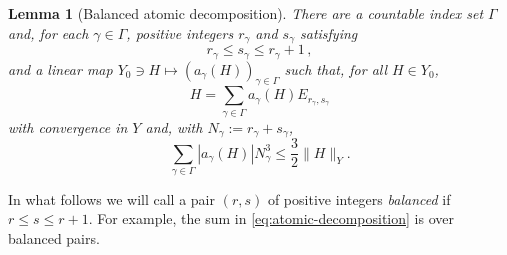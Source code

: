 \documentclass[11pt]{amsart}
\newtheorem{lemma}[theorem]{Lemma}
\theoremstyle{definition}
\theoremstyle{remark}
\begin{document}
\begin{lemma}[Balanced atomic decomposition]\label{lem:balanced-decomp}
There are a countable index set $\Gamma$ and, for each $\gamma\in\Gamma$, positive integers $r_\gamma$ and $s_\gamma$ satisfying
\[
 r_\gamma\leq s_\gamma\leq r_\gamma+1 \,,
\]
and a linear map $Y_0\ni H\mapsto (a_\gamma(H))_{\gamma\in\Gamma}$ such that, for all $H\in Y_0$,
\begin{equation}\label{eq:atomic-decomposition}
 H=\sum_{\gamma\in\Gamma} a_\gamma(H)E_{r_\gamma,s_\gamma}
\end{equation}
with convergence in $Y$ and, with $N_\gamma:=r_\gamma+s_\gamma$, 
\begin{equation}\label{eq:atomic-bound}
 \sum_{\gamma\in\Gamma} |a_\gamma(H)|N_\gamma^3
 \leq\frac32\|H\|_Y.
\end{equation}
\end{lemma}

In what follows we will call a pair $(r,s)$ of positive integers \emph{balanced} if $r\leq s\leq r+1$. For example, the sum in \eqref{eq:atomic-decomposition} is over balanced pairs.
\end{document}
